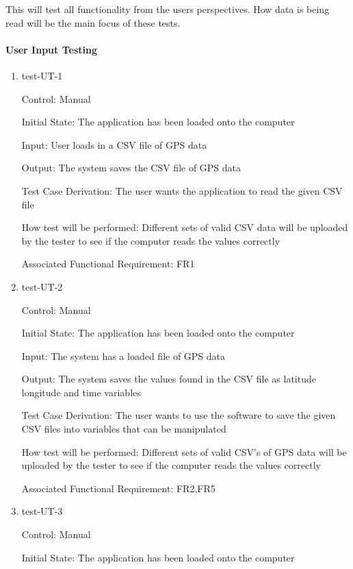 \documentclass[12pt, titlepage]{article}
\begin{document}
This will test all functionality from the users perspectives. How data is being read will be the main focus of these tests. 
		
\paragraph{User Input Testing}

\begin{enumerate}

\item{test-UT-1\\}

Control: Manual 
					
Initial State: The application has been loaded onto the computer
					
Input: User loads in a CSV file of GPS data
				
Output: The system saves the CSV file of GPS data

Test Case Derivation: The user wants the application to read the given CSV file 
					
How test will be performed: Different sets of valid CSV data will be uploaded by the tester to see if the computer reads the values correctly

Associated Functional Requirement: FR1 

\item{test-UT-2\\}

Control: Manual 
					
Initial State: The application has been loaded onto the computer
					
Input: The system has a loaded file of GPS data 
					
Output: The system saves the values found in the CSV file as latitude longitude and time variables

Test Case Derivation: The user wants to use the software to save the given CSV files into variables that can be manipulated
					
How test will be performed: Different sets of valid CSV's of GPS data will be uploaded by the tester to see if the computer reads the values correctly

Associated Functional Requirement: FR2,FR5

\item{test-UT-3\\}

Control: Manual 
					
Initial State: The application has been loaded onto the computer
					

\end{enumerate}
\end{document}
